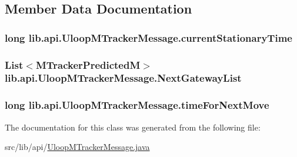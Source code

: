 \subsection{Member Data Documentation}
\hypertarget{classlib_1_1api_1_1UloopMTrackerMessage_a73fcf2704001aafa37e8f4fe716cefe6}{
\subsubsection[{current\+Stationary\+Time}]{\setlength{\rightskip}{0pt plus 5cm}long lib.\+api.\+Uloop\+M\+Tracker\+Message.\+current\+Stationary\+Time\hspace{0.3cm}{\ttfamily [private]}}}\label{classlib_1_1api_1_1UloopMTrackerMessage_a73fcf2704001aafa37e8f4fe716cefe6}
\hypertarget{classlib_1_1api_1_1UloopMTrackerMessage_a4faa2b9d0289c4803f5060f5b76d4d41}{
\subsubsection[{Next\+Gateway\+List}]{\setlength{\rightskip}{0pt plus 5cm}List$<${\bf M\+Tracker\+Predicted\+M}$>$ lib.\+api.\+Uloop\+M\+Tracker\+Message.\+Next\+Gateway\+List\hspace{0.3cm}{\ttfamily [private]}}}\label{classlib_1_1api_1_1UloopMTrackerMessage_a4faa2b9d0289c4803f5060f5b76d4d41}
\hypertarget{classlib_1_1api_1_1UloopMTrackerMessage_a93952c4aff54e16ddac6099ff2dce1b1}{
\subsubsection[{time\+For\+Next\+Move}]{\setlength{\rightskip}{0pt plus 5cm}long lib.\+api.\+Uloop\+M\+Tracker\+Message.\+time\+For\+Next\+Move\hspace{0.3cm}{\ttfamily [private]}}}\label{classlib_1_1api_1_1UloopMTrackerMessage_a93952c4aff54e16ddac6099ff2dce1b1}


The documentation for this class was generated from the following file\+:\begin{DoxyCompactItemize}
\item 
src/lib/api/\hyperlink{UloopMTrackerMessage_8java}{Uloop\+M\+Tracker\+Message.\+java}\end{DoxyCompactItemize}
